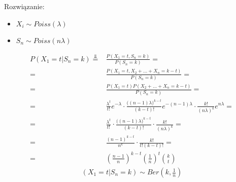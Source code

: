 Rozwiązanie:
\begin{itemize}
\item $ X_i\sim Poiss(\lambda) $
\item $ S_n\sim Poiss(n\lambda) $
\end{itemize}
\begin{align*}
P\left(X_1=t|S_n=k\right)\stackrel{\Perp}{=}&
\frac{P\left(X_1=t,S_n=k\right)}{P\left(S_n=k\right)}
=\\=&
\frac{P\left(X_1=t,X_2+\dots+X_n=k-t\right)}{P\left(S_n=k\right)}
=\\=&
\frac{P\left(X_1=t\right) P\left(X_2+\dots+X_n=k-t\right)}{P\left(S_n=k\right)}
=\\=&
\frac{\lambda^t}{t!}e^{-\lambda}
\cdot 
\frac{\bigl((n-1)\lambda\bigr)^{k-t}}{(k-t)!}e^{-(n-1)\lambda}
\cdot 
\frac{k!}{(n\lambda)^k}e^{n\lambda}
=\\=&
\frac{\lambda^t}{t!}
\cdot 
\frac{\bigl((n-1)\lambda\bigr)^{k-t}}{(k-t)!}
\cdot 
\frac{k!}{(n\lambda)^k}
=\\=&
\frac{(n-1)^{k-t}}{n^k}\cdot \frac{k!}{t!(k-t)!}
=\\=&
\left(\frac{n-1}{n}\right)^{k-t}\left(\frac{1}{n}\right)^t\binom{k}{t}
\end{align*}
\begin{gather*}
\left(X_1=t|S_n=k\right)\sim Ber(k,\tfrac{1}{n})
\end{gather*}